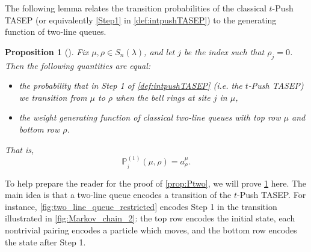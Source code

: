 \documentclass[12pt]{amsart}
\newtheorem{prop}[thm]{Proposition}
\theoremstyle{definition}
\newtheorem{definition}[thm]{Definition}
\newcommand{\PPone}[1]{\mathbb P^{(1)}_{#1}}
\begin{document}

\iffalse
The following lemma relates the transition probabilities of the classical $t$-Push TASEP (or equivalently \ref{Step1} in \cref{def:intpushTASEP}) to the generating function of two-line queues.


\begin{prop}[{\cite[Lemma 5.4]{AyyerMartinWilliams2025}}]\label{prop:Pone}
Fix $\mu,\rho\in S_n(\lambda)$, and let $j$ be the index such that $\rho_j=0$.  Then the following quantities are equal:
\begin{itemize}
\item the probability that in 
Step 1 of \cref{def:intpushTASEP} (i.e. the $t$-Push TASEP) we transition from $\mu$ to $\rho$ when the bell rings at site $j$ in $\mu$,
\item the weight generating function of classical
two-line queues with top row $\mu$ and bottom row $\rho$.
\end{itemize}
That is,
$$\PPone{_j}(\mu,\rho)=a^\mu_{\rho}.$$
\end{prop}


To help prepare the reader for the proof of \cref{prop:Ptwo}, we 
will prove \cref{prop:Pone} here.  The main idea  is that
a two-line queue encodes a transition of the $t$-Push TASEP.  For instance, \cref{fig:two_line_queue_restricted} encodes 
Step 1 in the transition illustrated in \cref{fig:Markov_chain_2}:
the top row encodes the initial state, each nontrivial pairing encodes a particle which moves, and 
the bottom row encodes the state after Step 1.
\end{document}
